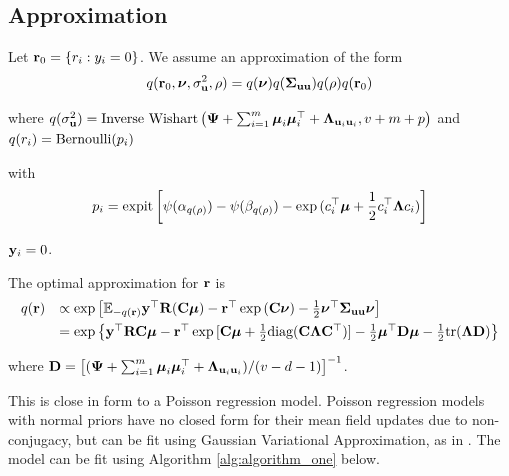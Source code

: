 \documentclass{article}[12pt]
\begin{document}
\subsection{Approximation}
Let ${\bf r}_0 = \{ r_i : y_i = 0 \}$.
We assume an approximation of the form
$$
q({\bf r}_0, {\boldsymbol \nu}, \sigma_{{\bf u}}^2, \rho) = q({\boldsymbol \nu}) q({\boldsymbol \Sigma}_{{\bf u} {\bf u}}) q(\rho) q({\bf r}_0) \\
$$

where 
$q(\sigma_{{\bf u}}^2) = \mbox{Inverse Wishart}\left({\boldsymbol \Psi} + \sum_{i=1}^m {\boldsymbol \mu}_i {\boldsymbol \mu}_i^\top + {\boldsymbol \Lambda}_{{\bf u}_i {\bf u}_i}, v + m + 
p\right)$ \mbox{and } $q(r_i) = \text{Bernoulli} (p_i)$

with
$$
p_i = \text{expit} \left[ \psi{(\alpha_{q(\rho)})} - \psi{(\beta_{q(\rho)})} - \exp{(c_i^\top{\boldsymbol\mu}+ {\frac{1}{2}}c_i^\top {\boldsymbol\Lambda}c_i)} \right]
$$

 ${\bf y}_i = 0$.


The optimal approximation for ${\bf r}$ is
$$
\begin{array}{rl}
q({\bf r}) &\propto \exp \left [ {\mathbb E}_{-q({\bf r})}{\bf y}^\top{\bf R}({\bf C}{\boldsymbol \mu}) - {\bf r}^\top\exp{({\bf C}{\boldsymbol\nu})}-{\frac{1}{2}} {\boldsymbol \nu}^\top {\boldsymbol\Sigma}_{{\bf u} {\bf u}} {\boldsymbol \nu} \right ] \\ [1ex]
	&= \exp{ \left\{ {\bf y}^\top{\bf R}{\bf C}{\boldsymbol\mu}- {\bf r}^\top \exp{[{\bf C}{\boldsymbol\mu}+ {\frac{1}{2}}\text{diag}({\bf C}{\boldsymbol\Lambda}{\bf C}^\top)]} - {\frac{1}{2}}{\boldsymbol\mu}^\top {\bf D}{\boldsymbol\mu}- {\frac{1}{2}}\text{tr}({\boldsymbol\Lambda}{\bf D}) \right\} }
\end{array}
$$

where ${\bf D} = \left[ ({\boldsymbol \Psi} + \sum_{i=1}^m {\boldsymbol \mu}_i {\boldsymbol \mu}_i^\top + {\boldsymbol \Lambda}_{{\bf u}_i{\bf u}_i}) / (v - d - 1) \right]^{-1}$. 

This is close in form to a Poisson regression model. Poisson regression models with normal priors have no
closed form for their mean field updates due to non- conjugacy, but can be fit using Gaussian Variational
Approximation, as in \citep{ormerod09}. The model can be fit using Algorithm \ref{alg:algorithm_one} below.
\end{document}
